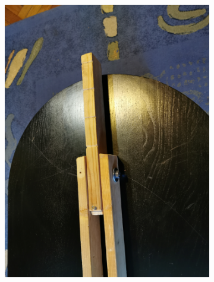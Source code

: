 \documentclass[a4paper,12pt]{article}
\begin{document}
\begin{figure}[h!]
\centering
\begin{subfigure}[t]{.4\linewidth}
\centering
\includegraphics[width=\linewidth]{elejesulynelkul.jpg}
\end{subfigure}%
~~
\begin{subfigure}[t]{.4\linewidth}

\end{subfigure}
\end{figure}
\end{document}
